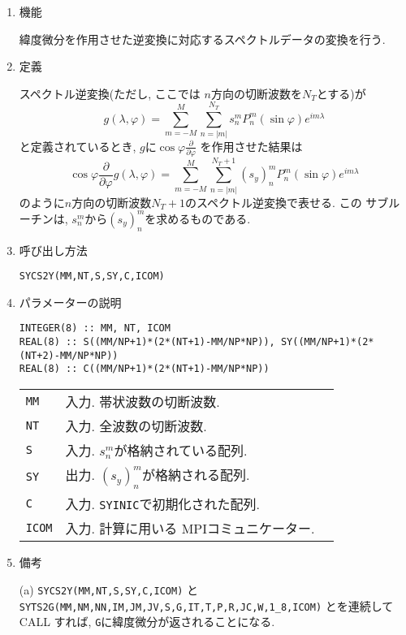 \documentclass[a4j]{jsarticle}
\begin{document}
\begin{enumerate}

\item 機能 

緯度微分を作用させた逆変換に対応するスペクトルデータの変換を行う.

\item 定義

  スペクトル逆変換(ただし, ここでは $n$方向の切断波数を$N_T$とする)が
\begin{equation}
g(\lambda,\varphi)=\sum^M_{m=-M}\sum^{N_T}_{n=|m|}
s^m_nP^m_n(\sin\varphi)e^{im\lambda}
\end{equation}
と定義されているとき, $g$に$\cos\varphi\frac{\partial}{\partial\varphi}$
を作用させた結果は
\begin{equation}
\cos\varphi\frac{\partial}{\partial\varphi}
g(\lambda,\varphi)=\sum^M_{m=-M}\sum^{N_T+1}_{n=|m|}
(s_y)^m_nP^m_n(\sin\varphi)e^{im\lambda}
\end{equation}
のように$n$方向の切断波数$N_T+1$のスペクトル逆変換で表せる. この
サブルーチンは, $s^m_n$から$(s_y)^m_n$を求めるものである.

\item 呼び出し方法 

\texttt{SYCS2Y(MM,NT,S,SY,C,ICOM)}
  
\item パラメーターの説明

\begin{verbatim}
INTEGER(8) :: MM, NT, ICOM
REAL(8) :: S((MM/NP+1)*(2*(NT+1)-MM/NP*NP)), SY((MM/NP+1)*(2*(NT+2)-MM/NP*NP))
REAL(8) :: C((MM/NP+1)*(2*(NT+1)-MM/NP*NP))
\end{verbatim}

\begin{tabular}{lll}
\texttt{MM} & 入力. 帯状波数の切断波数.\\    
\texttt{NT} & 入力. 全波数の切断波数.\\
\texttt{S} & 入力. $s^m_n$が格納されている配列.\\
\texttt{SY} & 出力. $(s_y)^m_n$が格納される配列.\\
\texttt{C} & 入力. \texttt{SYINIC}で初期化された配列.\\
\texttt{ICOM} & 入力. 計算に用いる MPIコミュニケーター.
\end{tabular}

\item 備考

(a) \texttt{SYCS2Y(MM,NT,S,SY,C,ICOM)} と 
  \texttt{SYTS2G(MM,NM,NN,IM,JM,JV,S,G,IT,T,P,R,JC,W,1\_8,ICOM)}
    とを連続して CALL すれば, \texttt{G}に緯度微分が返されることになる.
    
\end{enumerate}
\end{document}
